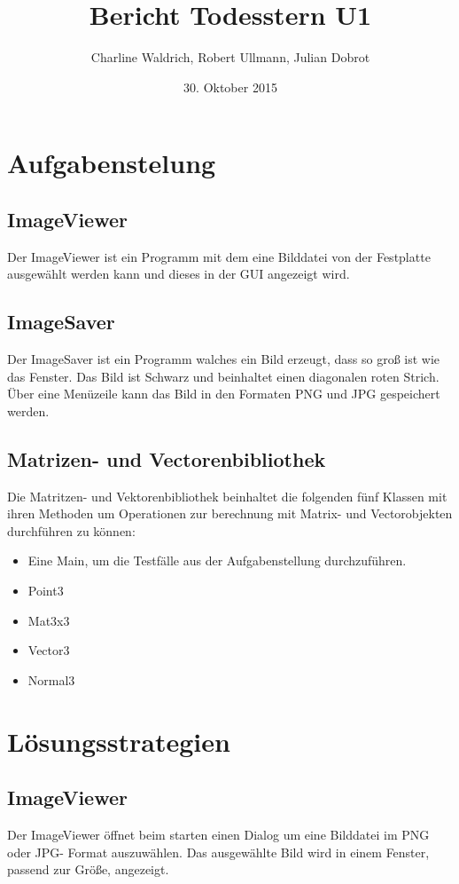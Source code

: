 \documentclass[a4paper,10pt]{ltxdoc}
\title{Bericht Todesstern U1}
\author{Charline Waldrich, Robert Ullmann, Julian Dobrot}
\date{30. Oktober 2015}
\begin{document}
\maketitle
\tableofcontents
\pagebreak

\section{Aufgabenstelung}

\subsection{ImageViewer}
Der ImageViewer ist ein Programm mit dem eine Bilddatei von der Festplatte ausgewählt werden kann und dieses in der GUI angezeigt wird. 
\subsection{ImageSaver}
Der ImageSaver ist ein Programm walches ein Bild erzeugt, dass so groß ist wie das Fenster.
Das Bild ist Schwarz und beinhaltet einen diagonalen roten Strich. Über eine Menüzeile kann das Bild in den Formaten PNG und JPG gespeichert werden.
\subsection{Matrizen- und Vectorenbibliothek}
Die Matritzen- und Vektorenbibliothek beinhaltet die folgenden fünf Klassen mit ihren Methoden um Operationen 
zur berechnung mit Matrix- und Vectorobjekten durchführen zu können:

\begin{itemize}

\item Eine Main, um die Testfälle aus der Aufgabenstellung durchzuführen.
\item Point3
\item Mat3x3
\item Vector3 
\item Normal3
\end{itemize}


\section{Lösungsstrategien}
\subsection{ImageViewer}
Der ImageViewer öffnet beim starten einen Dialog um eine Bilddatei im PNG oder JPG- Format auszuwählen. Das ausgewählte Bild wird in einem Fenster, passend zur Größe, angezeigt.
\end{document}

